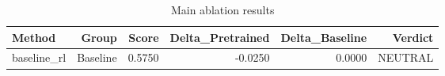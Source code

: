 \begin{table}[htbp]
\centering
\caption{Main ablation results}
\label{tab:main-results}
\begin{tabular}{lrrrrr}
\toprule
\textbf{Method} & \textbf{Group} & \textbf{Score} & \textbf{Delta\_Pretrained} & \textbf{Delta\_Baseline} & \textbf{Verdict} \\
\midrule
baseline\_rl & Baseline & 0.5750 & -0.0250 & 0.0000 & NEUTRAL \\
\bottomrule
\end{tabular}
\end{table}